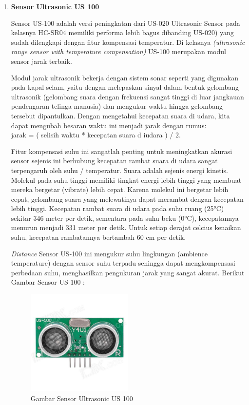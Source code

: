 \begin{enumerate}
\item \textbf{Sensor Ultrasonic  US 100}

\par Sensor US-100 adalah versi peningkatan dari US-020 Ultrasonic Sensor pada kelasnya HC-SR04 memiliki performa lebih bagus dibanding US-020) yang sudah dilengkapi dengan fitur kompensasi temperatur. Di kelasnya \textit{(ultrasonic range sensor with temperature compensation)} US-100 merupakan modul sensor jarak terbaik.
\par Modul jarak ultrasonik bekerja dengan sistem sonar seperti yang digunakan pada kapal selam, yaitu dengan melepaskan sinyal dalam bentuk gelombang ultrasonik (gelombang suara dengan frekuensi sangat tinggi di luar jangkauan pendengaran telinga manusia) dan mengukur waktu hingga gelombang tersebut dipantulkan. Dengan mengetahui kecepatan suara di udara, kita dapat mengubah besaran waktu ini menjadi jarak dengan rumus:\\ jarak = ( selisih waktu * kecepatan suara d iudara ) / 2.
\par Fitur kompensasi suhu ini sangatlah penting untuk meningkatkan akurasi sensor sejenis ini berhubung kecepatan rambat suara di udara sangat terpengaruh oleh suhu / temperatur. Suara adalah sejenis energi kinetis. Molekul pada suhu tinggi memiliki tingkat energi lebih tinggi yang membuat mereka bergetar (vibrate) lebih cepat. Karena molekul ini bergetar lebih cepat, gelombang suara yang melewatinya dapat merambat dengan kecepatan lebih tinggi. Kecepatan rambat suara di udara pada suhu ruang (25°C) sekitar 346 meter per detik, sementara pada suhu beku (0°C), kecepatannya menurun menjadi 331 meter per detik. Untuk setiap derajat celcius kenaikan suhu, kecepatan rambatannya bertambah 60 cm per detik.
\par \textit{Distance }Sensor US-100 ini mengukur suhu lingkungan (ambience temperature) dengan sensor suhu terpadu sehingga dapat mengkompensasi perbedaan suhu, menghasilkan pengukuran jarak yang sangat akurat. Berikut Gambar Sensor US 100 :
\begin{figure}[H]
\centering
\includegraphics[width=0.5\textwidth]{figures/sensor.jpg}
\caption{Gambar Sensor Ultrasonic US 100}
\label{print}
\end{figure}


\end{enumerate}
